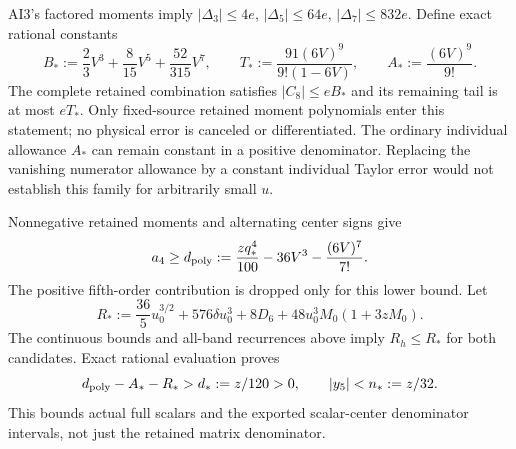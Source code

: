 AI3's factored moments imply $|\Delta_3|\le4e$, $|\Delta_5|\le64e$, $|\Delta_7|\le832e$. Define exact rational constants
\begin{equation}
 B_*:=\frac23V^3+\frac8{15}V^5+\frac{52}{315}V^7,
 \qquad T_*:=\frac{91(6V)^9}{9!(1-6V)},
 \qquad A_*:=\frac{(6V)^9}{9!}.
 \label{eq:ai4-retained-constants}
\end{equation}
The complete retained combination satisfies $|C_8|\le eB_*$ and its remaining tail is at most $eT_*$. Only fixed-source retained moment polynomials enter this statement; no physical error is canceled or differentiated. The ordinary individual allowance $A_*$ can remain constant in a positive denominator. Replacing the vanishing numerator allowance by a constant individual Taylor error would not establish this family for arbitrarily small $u$.

Nonnegative retained moments and alternating center signs give
\begin{equation}
 a_4\ge d_{\rm poly}:=\frac{zq_*^4}{100}-36V^3-\frac{(6V)^7}{7!}.
\end{equation}
The positive fifth-order contribution is dropped only for this lower bound. Let
\begin{equation}
 R_*:=\frac{36}{5}u_0^{3/2}+576\delta u_0^3+8D_6
       +48u_0^3M_0(1+3zM_0).
\end{equation}
The continuous bounds and all-band recurrences above imply $R_h\le R_*$ for both candidates. Exact rational evaluation proves
\begin{equation}
 d_{\rm poly}-A_*-R_*>d_*:=z/120>0,\qquad
 |y_5|<n_*:=z/32.
 \label{eq:ai4-full-denominator}
\end{equation}
This bounds actual full scalars and the exported scalar-center denominator intervals, not just the retained matrix denominator.

